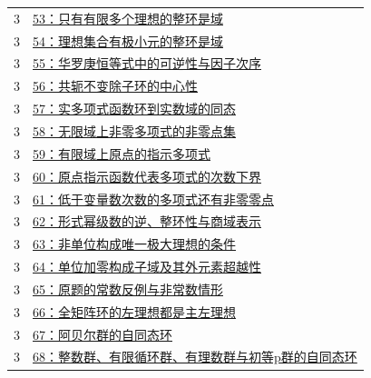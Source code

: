 \documentclass[UTF8,a4paper,11pt,fontset=windows]{ctexart}
\begin{document}
\begin{longtable}{cp{13.5cm}}
3 & \hyperref[ex:3:53]{53：只有有限多个理想的整环是域}\\
3 & \hyperref[ex:3:54]{54：理想集合有极小元的整环是域}\\
3 & \hyperref[ex:3:55]{55：华罗庚恒等式中的可逆性与因子次序}\\
3 & \hyperref[ex:3:56]{56：共轭不变除子环的中心性}\\
3 & \hyperref[ex:3:57]{57：实多项式函数环到实数域的同态}\\
3 & \hyperref[ex:3:58]{58：无限域上非零多项式的非零点集}\\
3 & \hyperref[ex:3:59]{59：有限域上原点的指示多项式}\\
3 & \hyperref[ex:3:60]{60：原点指示函数代表多项式的次数下界}\\
3 & \hyperref[ex:3:61]{61：低于变量数次数的多项式还有非零零点}\\
3 & \hyperref[ex:3:62]{62：形式幂级数的逆、整环性与商域表示}\\
3 & \hyperref[ex:3:63]{63：非单位构成唯一极大理想的条件}\\
3 & \hyperref[ex:3:64]{64：单位加零构成子域及其外元素超越性}\\
3 & \hyperref[ex:3:65]{65：原题的常数反例与非常数情形}\\
3 & \hyperref[ex:3:66]{66：全矩阵环的左理想都是主左理想}\\
3 & \hyperref[ex:3:67]{67：阿贝尔群的自同态环}\\
3 & \hyperref[ex:3:68]{68：整数群、有限循环群、有理数群与初等p群的自同态环}\\
\bottomrule\end{longtable}
\end{document}
